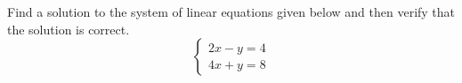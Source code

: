 \documentclass[11pt,letterpaper]{article}
\begin{document}

\problem Find a solution to the system of linear equations given below and then verify that the solution is correct.
	\[
	\begin{cases}
	2x - y= 4 \\
	4x + y= 8
	\end{cases}
	\] \pspace

\end{document}
